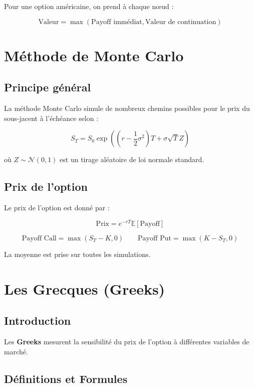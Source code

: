 \documentclass{article}
\begin{document}
Pour une option américaine, on prend à chaque nœud :

\[
\text{Valeur} = \max(\text{Payoff immédiat}, \text{Valeur de continuation})
\]

\section{Méthode de Monte Carlo}

\subsection{Principe général}

La méthode Monte Carlo simule de nombreux chemins possibles pour le prix du sous-jacent à l'échéance selon :

\begin{equation}
S_T = S_0 \exp\left( \left(r - \frac{1}{2}\sigma^2\right)T + \sigma \sqrt{T} Z \right)
\end{equation}

où \( Z \sim \mathcal{N}(0,1) \) est un tirage aléatoire de loi normale standard.

\subsection{Prix de l'option}

Le prix de l'option est donné par :

\begin{equation}
\text{Prix} = e^{-rT} \mathbb{E}[\text{Payoff}]
\end{equation}

\[
\text{Payoff Call} = \max(S_T - K, 0)
\quad\quad
\text{Payoff Put} = \max(K - S_T, 0)
\]

La moyenne est prise sur toutes les simulations.

\section{Les Grecques (Greeks)}

\subsection{Introduction}

Les \textbf{Greeks} mesurent la sensibilité du prix de l'option à différentes variables de marché.

\subsection{Définitions et Formules}
\end{document}
